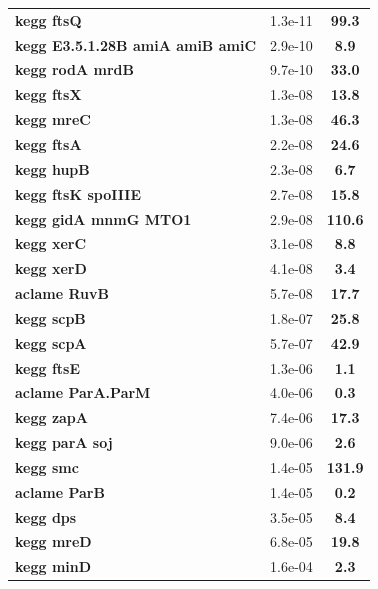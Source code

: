 \begin{landscape}
\begin{table}
{\begin{minipage}[t]{0.3\textwidth}
\begin{tabular}{>{\bfseries}p{\textwidth}cc}
\rowcolor{posit}kegg ftsQ&1.3e-11&\textbf{\colorbox{colorpowerxxxx}{99.3}}\\
\rowcolor{posit}kegg E3.5.1.28B amiA amiB amiC&2.9e-10&\textbf{\colorbox{colorpowerxx}{8.9}}\\
\rowcolor{posit}kegg rodA mrdB&9.7e-10&\textbf{\colorbox{colorpowerxxx}{33.0}}\\
\rowcolor{posit}kegg ftsX&1.3e-08&\textbf{\colorbox{colorpowerxx}{13.8}}\\
\rowcolor{posit}kegg mreC&1.3e-08&\textbf{\colorbox{colorpowerxxx}{46.3}}\\
\rowcolor{posit}kegg ftsA&2.2e-08&\textbf{\colorbox{colorpowerxxx}{24.6}}\\
\rowcolor{posit}kegg hupB&2.3e-08&\textbf{\colorbox{colorpowerx}{6.7}}\\
\rowcolor{posit}kegg ftsK spoIIIE&2.7e-08&\textbf{\colorbox{colorpowerxx}{15.8}}\\
\rowcolor{posit}kegg gidA mnmG MTO1&2.9e-08&\textbf{\colorbox{colorpowerxxxx}{110.6}}\\
\rowcolor{posit}kegg xerC&3.1e-08&\textbf{\colorbox{colorpowerxx}{8.8}}\\
\rowcolor{posit}kegg xerD&4.1e-08&\textbf{\colorbox{colorpowerx}{3.4}}\\
\rowcolor{posit}aclame RuvB&5.7e-08&\textbf{\colorbox{colorpowerxx}{17.7}}\\
\rowcolor{posit}kegg scpB&1.8e-07&\textbf{\colorbox{colorpowerxxx}{25.8}}\\
\rowcolor{posit}kegg scpA&5.7e-07&\textbf{\colorbox{colorpowerxxx}{42.9}}\\
\rowcolor{posit}kegg ftsE&1.3e-06&\textbf{\colorbox{colorpower}{1.1}}\\
\rowcolor{posit}aclame ParA.ParM&4.0e-06&\textbf{\colorbox{colorpowernegx}{0.3}}\\
\rowcolor{posit}kegg zapA&7.4e-06&\textbf{\colorbox{colorpowerxx}{17.3}}\\
\rowcolor{posit}kegg parA soj&9.0e-06&\textbf{\colorbox{colorpower}{2.6}}\\
\rowcolor{posit}kegg smc&1.4e-05&\textbf{\colorbox{colorpowerxxxx}{131.9}}\\
\rowcolor{posit}aclame ParB&1.4e-05&\textbf{\colorbox{colorpowernegx}{0.2}}\\
\rowcolor{posit}kegg dps&3.5e-05&\textbf{\colorbox{colorpowerxx}{8.4}}\\
\rowcolor{posit}kegg mreD&6.8e-05&\textbf{\colorbox{colorpowerxx}{19.8}}\\
\rowcolor{posit}kegg minD&1.6e-04&\textbf{\colorbox{colorpower}{2.3}}\\

\end{tabular}
\end{minipage}}
\end{table}
\end{landscape}
